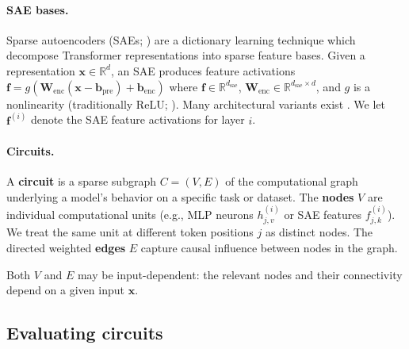 \documentclass{article}
\theoremstyle{plain}
\theoremstyle{definition}
\theoremstyle{remark}
\begin{document}
\paragraph{SAE bases.} Sparse autoencoders (SAEs; \citealp{bricken2023towards,cunningham2023sparse}) are a dictionary learning technique which decompose Transformer representations into sparse feature bases. Given a representation $\mathbf{x} \in \mathbb{R}^{d}$, an SAE produces feature activations $\mathbf{f} = g(\mathbf{W}_\text{enc}(\mathbf{x} - \mathbf{b}_\text{pre}) + \mathbf{b}_\text{enc})$ where $\mathbf{f} \in \mathbb{R}^{d_\text{sae}}$, $\mathbf{W}_\text{enc} \in \mathbb{R}^{d_\text{sae} \times d}$, and $g$ is a nonlinearity (traditionally ReLU; \citealp{bricken2023towards}). Many architectural variants exist \citep{rajamanoharan2024gated,gao2025scaling,rajamanoharan2024jumprelu}. We let $\mathbf{f}^{(i)}$ denote the SAE feature activations for layer $i$.

\paragraph{Circuits.} A \textbf{circuit} is a sparse subgraph $C = (V, E)$ of the computational graph underlying a model's behavior on a specific task or dataset. The \textbf{nodes} $V$ are individual computational units (e.g., MLP neurons $h^{(i)}_{j,v}$ or SAE features $f^{(i)}_{j,k}$). We treat the same unit at different token positions $j$ as distinct nodes. The directed weighted \textbf{edges} $E$ capture causal influence between nodes in the graph.

Both $V$ and $E$ may be input-dependent: the relevant nodes and their connectivity depend on a given input $\mathbf{x}$.

\subsection{Evaluating circuits}
\end{document}
